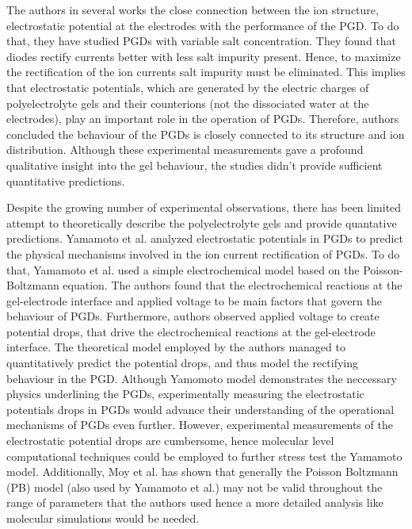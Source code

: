 \documentclass[twoside,twocolumn,9pt]{article}
\begin{document}
The authors in several works \cite{So2012IonicElectrodes,Vlassiouk2008NanofluidicSolutions,Zhang2012FlexibleCellulose,Han2009IonicMicrochip} the close connection between the ion structure, electrostatic potential at the electrodes with the performance of the PGD. To do that, they have studied PGDs with variable salt concentration. They found that diodes rectify currents better with less salt impurity present. Hence, to maximize the rectification of the ion currents salt impurity must be eliminated. This implies that electrostatic potentials, which are generated by the electric charges of polyelectrolyte gels and their counterions (not the dissociated water at the electrodes), play an important role in the operation of PGDs. Therefore, authors concluded the behaviour of the PGDs  is closely connected to its structure and ion distribution. Although these experimental measurements gave a profound qualitative insight into the gel behaviour, the studies didn't provide sufficient quantitative predictions.



 Despite the growing number of experimental observations, there has been limited attempt to theoretically describe the polyelectrolyte gels\cite{Yamamoto2014ElectrochemicalDiodes} and provide quantative predictions. Yamamoto et al.  \cite{Yamamoto2014ElectrochemicalDiodes}  analyzed electrostatic potentials in PGDs to predict the physical mechanisms involved in the ion current rectification of PGDs. To do that, Yamamoto et al. used a simple electrochemical model based on the Poisson-Boltzmann equation.  The authors found that the electrochemical reactions at the gel-electrode interface and applied voltage to be main factors that govern the behaviour of PGDs. Furthermore, authors observed applied voltage to create potential drops, that drive the electrochemical reactions at the gel-electrode interface. The theoretical model employed by the authors managed to quantitatively predict the potential drops, and thus model the rectifying behaviour in the PGD. Although Yamomoto model demonstrates the neccessary physics underlining the PGDs, experimentally measuring the electrostatic potentials drops in PGDs would advance their understanding of the operational mechanisms of PGDs even further. However, experimental measurements of the electrostatic potential drops are cumbersome, hence molecular level computational techniques could be employed to further stress test the Yamamoto model. Additionally, Moy et al.\cite{Moy2000TestsDynamics} has shown that generally the Poisson Boltzmann (PB) model (also used by  Yamamoto et al.\cite{Yamamoto2014ElectrochemicalDiodes}) may not be valid throughout the range of parameters that the authors used hence a more detailed analysis like molecular simulations would be needed.
\end{document}
